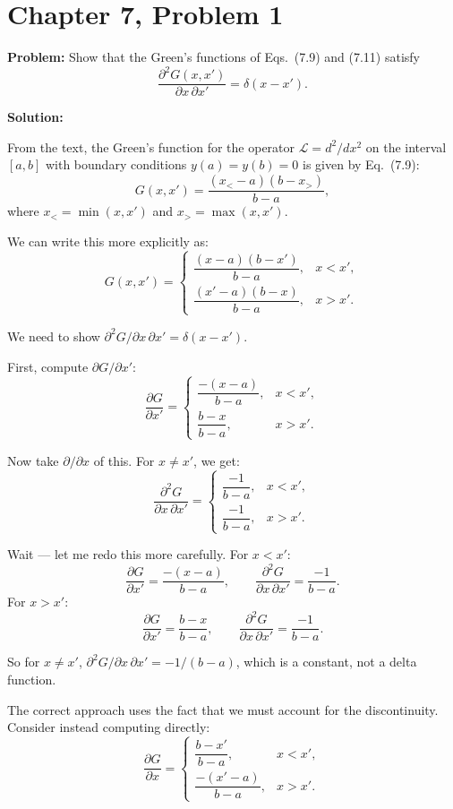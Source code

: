 \documentclass[12pt]{article}
\begin{document}
\section*{Chapter 7, Problem 1}

\textbf{Problem:} Show that the Green's functions of Eqs.\ (7.9) and (7.11) satisfy
\[
\frac{\partial^2 G(x,x')}{\partial x\,\partial x'} = \delta(x - x').
\]

\bigskip
\textbf{Solution:}

From the text, the Green's function for the operator $\mathcal{L} = d^2/dx^2$ on the interval $[a,b]$ with boundary conditions $y(a) = y(b) = 0$ is given by Eq.\ (7.9):
\[
G(x,x') = \frac{(x_< - a)(b - x_>)}{b - a},
\]
where $x_< = \min(x,x')$ and $x_> = \max(x,x')$.

We can write this more explicitly as:
\[
G(x,x') = \begin{cases} \dfrac{(x-a)(b-x')}{b-a}, & x < x', \\[8pt]
\dfrac{(x'-a)(b-x)}{b-a}, & x > x'.
\end{cases}
\]

We need to show $\partial^2 G/\partial x\,\partial x' = \delta(x-x')$.

First, compute $\partial G/\partial x'$:
\[
\frac{\partial G}{\partial x'} = \begin{cases} \dfrac{-(x-a)}{b-a}, & x < x', \\[8pt]
\dfrac{b-x}{b-a}, & x > x'.
\end{cases}
\]

Now take $\partial/\partial x$ of this. For $x \neq x'$, we get:
\[
\frac{\partial^2 G}{\partial x\,\partial x'} = \begin{cases} \dfrac{-1}{b-a}, & x < x', \\[8pt]
\dfrac{-1}{b-a}, & x > x'.
\end{cases}
\]

Wait --- let me redo this more carefully. For $x < x'$:
\[
\frac{\partial G}{\partial x'} = \frac{-(x-a)}{b-a}, \qquad \frac{\partial^2 G}{\partial x\,\partial x'} = \frac{-1}{b-a}.
\]
For $x > x'$:
\[
\frac{\partial G}{\partial x'} = \frac{b-x}{b-a}, \qquad \frac{\partial^2 G}{\partial x\,\partial x'} = \frac{-1}{b-a}.
\]

So for $x \neq x'$, $\partial^2 G/\partial x\,\partial x' = -1/(b-a)$, which is a constant, not a delta function.

The correct approach uses the fact that we must account for the discontinuity. Consider instead computing directly:
\[
\frac{\partial G}{\partial x} = \begin{cases} \dfrac{b - x'}{b-a}, & x < x', \\[8pt]
\dfrac{-(x'-a)}{b-a}, & x > x'.
\end{cases}
\]
\end{document}
